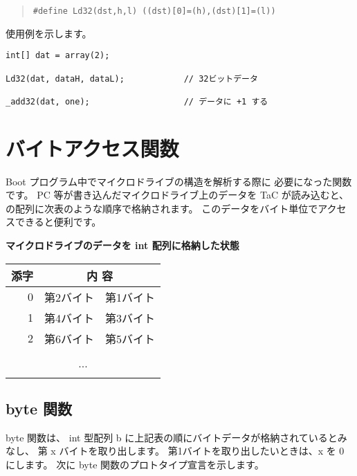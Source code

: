 \begin{quote}
\begin{verbatim}
#define Ld32(dst,h,l) ((dst)[0]=(h),(dst)[1]=(l))
\end{verbatim}
\end{quote}

使用例を示します。

\begin{mylist}
\begin{verbatim}
int[] dat = array(2);

Ld32(dat, dataH, dataL);            // 32ビットデータ

_add32(dat, one);                   // データに +1 する
\end{verbatim}
\end{mylist}

\section{バイトアクセス関数}

Boot プログラム中でマイクロドライブの構造を解析する際に
必要になった関数です。
PC 等が書き込んだマイクロドライブ上のデータを TaC が読み込むと、
\cmml の配列に次表のような順序で格納されます。
このデータをバイト単位でアクセスできると便利です。

\begin{center}
{\bf マイクロドライブのデータを int 配列に格納した状態} \\
\begin{tabular}{| r | c | c |}
\hline
\multicolumn{1}{|c|}{添字} & \multicolumn{2}{|c|}{内 容}          \\
\hline
0 & 第2バイト & 第1バイト \\
\hline
1 & 第4バイト & 第3バイト \\
\hline
2 & 第6バイト & 第5バイト \\
\hline
      &       &       \\
\multicolumn{3}{|c|}{...}           \\
      &       &       \\
\hline
\end{tabular}
\end{center}

\subsection{byte 関数}

byte 関数は、
int 型配列 b に上記表の順にバイトデータが格納されているとみなし、
第 x バイトを取り出します。
第1バイトを取り出したいときは、x を 0 にします。
次に byte 関数のプロトタイプ宣言を示します。

